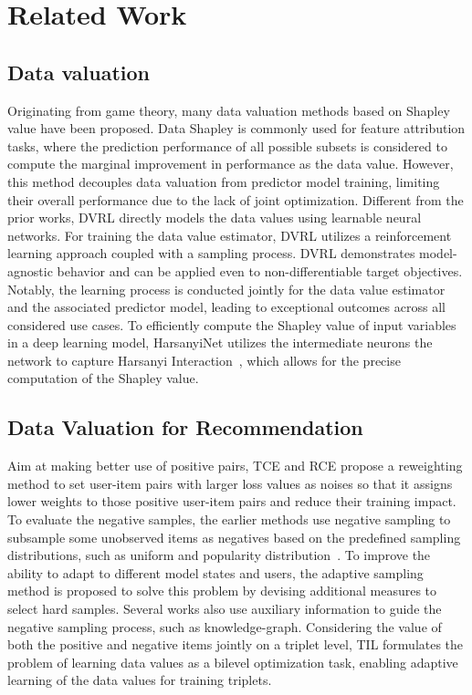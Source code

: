 \section{Related Work}
\subsection{Data valuation}
Originating from game theory, many data valuation methods based on Shapley value have been proposed. Data Shapley \cite{ghorbani2019data} is commonly used for feature attribution tasks, where the prediction performance of all possible subsets is considered to compute the marginal improvement in performance as the data value. However, this method decouples data valuation from predictor model training, limiting their overall performance due to the lack of joint optimization.
Different from the prior works, DVRL \cite{yoon2020data} directly models the data values using learnable neural networks. For training the data value estimator, DVRL utilizes a reinforcement learning approach coupled with a sampling process. DVRL demonstrates model-agnostic behavior and can be applied even to non-differentiable target objectives. Notably, the learning process is conducted jointly for the data value estimator and the associated predictor model, leading to exceptional outcomes across all considered use cases. To efficiently compute the Shapley value of input variables in a deep learning model, HarsanyiNet utilizes the intermediate neurons the network to capture Harsanyi Interaction~\cite{chen2023harsanyinet}, which allows for the precise computation of the Shapley value.

\subsection{Data Valuation for Recommendation}
Aim at making better use of positive pairs, TCE and RCE \cite{10.1145/3437963.3441800} propose a reweighting method to set user-item pairs with larger loss values as noises so that it assigns lower weights to those positive user-item pairs and reduce their training impact. To evaluate the negative samples, the earlier methods use negative sampling to subsample some unobserved items as negatives based on the predefined sampling distributions, such as uniform and popularity distribution~\cite{10.5555/3367243.3367349,caselles2018word2vec, 10.1145/3097983.3098202, gantner2012personalized,zhu2022gain}. To improve the ability to adapt to different model states and users, the adaptive sampling method is proposed to solve this problem by devising additional measures to select hard samples\cite{10.1145/2556195.2556248, 10.1145/3366423.3380187}. Several works also use auxiliary information to guide the negative sampling process, such as knowledge-graph\cite{10.1145/3366423.3380098, 10.5555/3367243.3367349}. Considering the value of both the positive and negative items jointly on a triplet level, TIL \cite{wu2022adapting} formulates the problem of learning data values as a bilevel optimization task, enabling adaptive learning of the data values for training triplets.